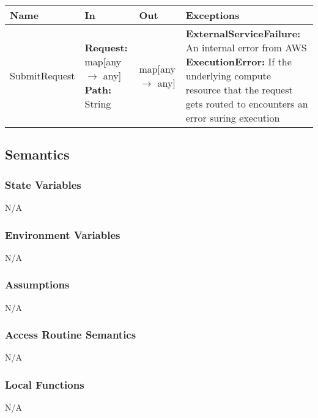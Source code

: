 \documentclass[12pt, titlepage]{article}
\begin{document}
\begin{center}
  \begin{tabular}{>{\raggedright}p{3cm} >{\raggedright}p{5cm}
    >{\raggedright}p{4cm} p{4cm}}
    \hline
    \textbf{Name} & \textbf{In} & \textbf{Out} & \textbf{Exceptions} \\
    \hline
    SubmitRequest & \textbf{Request:} map[any $\rightarrow$ any]
    \newline \textbf{Path:} String & map[any $\rightarrow$ any] &
    \textbf{ExternalServiceFailure:} An internal error from
    AWS \newline \textbf{ExecutionError:} If the underlying compute
    resource that the request gets routed to encounters an error
    suring execution \\
    \hline
  \end{tabular}
\end{center}

\subsection{Semantics}

\subsubsection{State Variables}

N/A

\subsubsection{Environment Variables}

N/A

\subsubsection{Assumptions}

N/A

\subsubsection{Access Routine Semantics}

N/A

\subsubsection{Local Functions}

N/A

\end{document}
